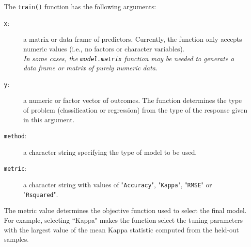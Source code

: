 \documentclass[caret-main.tex]{subfiles}
\begin{document}

\noindent The \texttt{train()} function has the following arguments:
\begin{description}
\item[\texttt{x}:] a matrix or data frame of predictors. Currently, the function only accepts numeric
values (i.e., no factors or character variables). \\ \textit{In some cases, the \texttt{model.matrix} function may be needed to generate a data frame or matrix of purely numeric data}.
\vspace{0.4cm}
\item[\texttt{y}:] a numeric or factor vector of outcomes. The function determines the type of problem
(classification or regression) from the type of the response given in this argument.
\vspace{0.4cm}
\item[\texttt{method}:] a character string specifying the type of model to be used.
\vspace{0.4cm}
\item[\texttt{metric}:] a character string with values of "\texttt{Accuracy}", "\texttt{Kappa}", "\texttt{RMSE}" or "\texttt{Rsquared}".

\end{description}
\bigskip
The metric value determines the objective function used to select the final model. For example,
selecting ``Kappa" makes the function select the tuning parameters with the largest value
of the mean Kappa statistic computed from the held-out samples.
\end{document}
